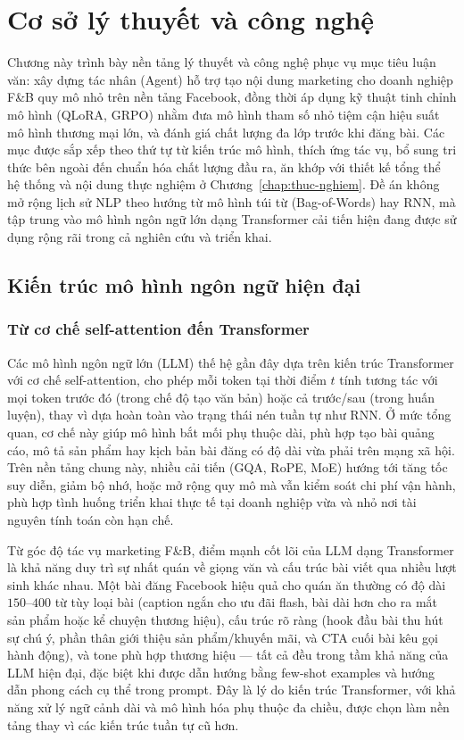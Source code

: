 \chapter{Cơ sở lý thuyết và công nghệ}\label{chap:ly-thuyet}

Chương này trình bày nền tảng lý thuyết và công nghệ phục vụ mục tiêu luận
văn: xây dựng tác nhân (Agent) hỗ trợ tạo nội dung marketing cho doanh
nghiệp F\&B quy mô nhỏ trên nền tảng Facebook, đồng thời áp dụng kỹ
thuật tinh chỉnh mô hình (QLoRA, GRPO) nhằm đưa mô hình tham số nhỏ
tiệm cận hiệu suất mô hình thương mại lớn, và đánh giá chất lượng đa lớp
trước khi đăng bài. Các mục được sắp xếp theo thứ tự từ kiến trúc mô
hình, thích ứng tác vụ, bổ sung tri thức bên ngoài đến chuẩn hóa chất
lượng đầu ra, ăn khớp với thiết kế tổng thể hệ thống và nội dung thực
nghiệm ở Chương~\ref{chap:thuc-nghiem}. Đề án không mở rộng lịch sử
NLP theo hướng từ mô hình túi từ (Bag-of-Words) hay RNN, mà tập trung
vào mô hình ngôn ngữ lớn dạng Transformer cải tiến hiện đang được sử dụng
rộng rãi trong cả nghiên cứu và triển khai.

\section{Kiến trúc mô hình ngôn ngữ hiện đại}\label{sec:llm-kiem-truc}

\subsection{Từ cơ chế self-attention đến Transformer}

Các mô hình ngôn ngữ lớn (LLM) thế hệ gần đây dựa trên kiến trúc
Transformer với cơ chế self-attention, cho phép mỗi token
tại thời điểm $t$ tính tương tác với mọi token trước đó (trong chế độ
tạo văn bản) hoặc cả trước/sau (trong huấn luyện), thay vì dựa hoàn toàn
vào trạng thái nén tuần tự như RNN. Ở mức tổng quan, cơ chế này giúp mô
hình bắt mối phụ thuộc dài, phù hợp tạo bài quảng cáo, mô tả sản phẩm
hay kịch bản bài đăng có độ dài vừa phải trên mạng xã hội. Trên nền tảng
chung này, nhiều cải tiến (GQA, RoPE, MoE) hướng tới tăng tốc suy diễn,
giảm bộ nhớ, hoặc mở rộng quy mô mà vẫn kiểm soát chi phí vận hành,
phù hợp tình huống triển khai thực tế tại doanh nghiệp vừa và nhỏ nơi
tài nguyên tính toán còn hạn chế.

Từ góc độ tác vụ marketing F\&B, điểm mạnh cốt lõi của LLM dạng
Transformer là khả năng duy trì sự nhất quán về giọng văn và cấu trúc
bài viết qua nhiều lượt sinh khác nhau. Một bài đăng Facebook hiệu quả
cho quán ăn thường có độ dài $150$--$400$ từ tùy loại bài (caption ngắn
cho ưu đãi flash, bài dài hơn cho ra mắt sản phẩm hoặc kể chuyện thương
hiệu), cấu trúc rõ ràng (hook đầu bài thu hút sự chú ý, phần thân giới
thiệu sản phẩm/khuyến mãi, và CTA cuối bài kêu gọi hành động), và tone
phù hợp thương hiệu --- tất cả
đều trong tầm khả năng của LLM hiện đại, đặc biệt khi được dẫn hướng
bằng few-shot examples và hướng dẫn phong cách cụ thể trong prompt. Đây
là lý do kiến trúc Transformer, với khả năng xử lý ngữ cảnh dài và mô
hình hóa phụ thuộc đa chiều, được chọn làm nền tảng thay vì các kiến
trúc tuần tự cũ hơn.

